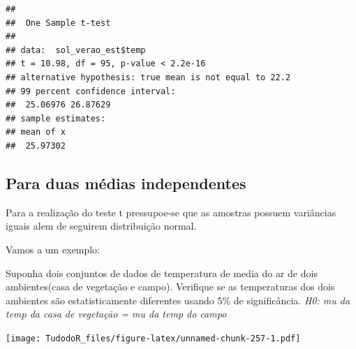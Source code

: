 \documentclass[
]{book}
\newenvironment{Shaded}{\begin{snugshade}}{\end{snugshade}}
\newcommand{\CommentTok}[1]{\textcolor[rgb]{0.56,0.35,0.01}{\textit{#1}}}
\newcommand{\DataTypeTok}[1]{\textcolor[rgb]{0.13,0.29,0.53}{#1}}
\newcommand{\FloatTok}[1]{\textcolor[rgb]{0.00,0.00,0.81}{#1}}
\newcommand{\KeywordTok}[1]{\textcolor[rgb]{0.13,0.29,0.53}{\textbf{#1}}}
\newcommand{\NormalTok}[1]{#1}
\newcommand{\OperatorTok}[1]{\textcolor[rgb]{0.81,0.36,0.00}{\textbf{#1}}}
\newcommand{\StringTok}[1]{\textcolor[rgb]{0.31,0.60,0.02}{#1}}
\begin{document}
\begin{Shaded}
\end{Shaded}

\begin{verbatim}
## 
##  One Sample t-test
## 
## data:  sol_verao_est$temp
## t = 10.98, df = 95, p-value < 2.2e-16
## alternative hypothesis: true mean is not equal to 22.2
## 99 percent confidence interval:
##  25.06976 26.87629
## sample estimates:
## mean of x 
##  25.97302
\end{verbatim}

\hypertarget{para-duas-muxe9dias-independentes}{%
\subsection{Para duas médias independentes}\label{para-duas-muxe9dias-independentes}}

Para a realização do teste t pressupoe-se que as amostras possuem variâncias iguais
alem de seguirem distribuição normal.

Vamos a um exemplo:

Suponha dois conjuntos de dados de temperatura de media do ar de dois ambientes(casa de vegetação e campo). Verifique se as temperaturas dos dois ambientes são estatisticamente diferentes usando 5\% de significância.
\emph{H0: mu da temp da casa de vegetação = mu da temp do campo}

\begin{Shaded}
\end{Shaded}

\texttt{[image: TudodoR\_files/figure-latex/unnamed-chunk-257-1.pdf]}

\begin{Shaded}
\end{Shaded}
\end{document}
